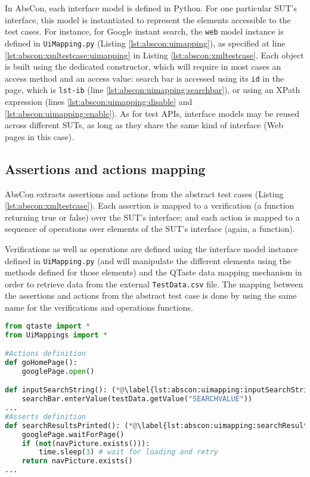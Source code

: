 In AbsCon, each interface model is defined in Python. For one particular SUT's interface, this model is instantiated to represent the elements accessible to the test cases. For instance, for Google instant search, the \texttt{web} model instance is defined in \texttt{UiMapping.py} (Listing \ref{lst:abscon:uimapping}), as specified at line \ref{lst:abscon:xmltestcase:uimapping} in Listing \ref{lst:abscon:xmltestcase}. Each object is built using the dedicated constructor, which will require in most cases an access method and an access value: \eg search bar is accessed using its \texttt{id} in the page, which is \texttt{lst-ib} (line \ref{lst:abscon:uimapping:searchbar}), or using an XPath expression (lines \ref{lst:abscon:uimapping:disable} and \ref{lst:abscon:uimapping:enable}).
%
As for test APIs, interface models may be reused across different SUTs, as long as they share the same kind of interface (Web pages in this case).

\subsection{Assertions and actions mapping}

AbsCon extracts assertions and actions from the abstract test cases (Listing \ref{lst:abscon:xmltestcase}). Each assertion is mapped to a verification (\ie a function returning true or false) over the SUT's interface; and each action is mapped to a sequence of operations over elements of the SUT's interface (\ie again, a function). 

Verifications as well as operations are defined using the interface model instance defined in \texttt{UiMapping.py} (and will manipulate the different elements using the methods defined for those elements) and the QTaste data mapping mechanism in order to retrieve data from the external \texttt{TestData.csv} file. The mapping between the assertions and actions from the abstract test case is done by using the same name for the verifications and operations functions.

\begin{lstlisting}[language=Python,
float,
label=lst:abscon:operations,
caption={Verifications and operations mapping (\texttt{Operations.py})}]
from qtaste import *
from UiMappings import *

#Actions definition
def goHomePage():
	googlePage.open() 

def inputSearchString(): (*@\label{lst:abscon:uimapping:inputSearchString}@*)
	searchBar.enterValue(testData.getValue("SEARCHVALUE"))
...
#Asserts definition
def searchResultsPrinted(): (*@\label{lst:abscon:uimapping:searchResultsPrinted}@*)
	googlePage.waitForPage()
	if (not(navPicture.exists())):
		time.sleep(3) # wait for loading and retry
	return navPicture.exists()
...
\end{lstlisting}

